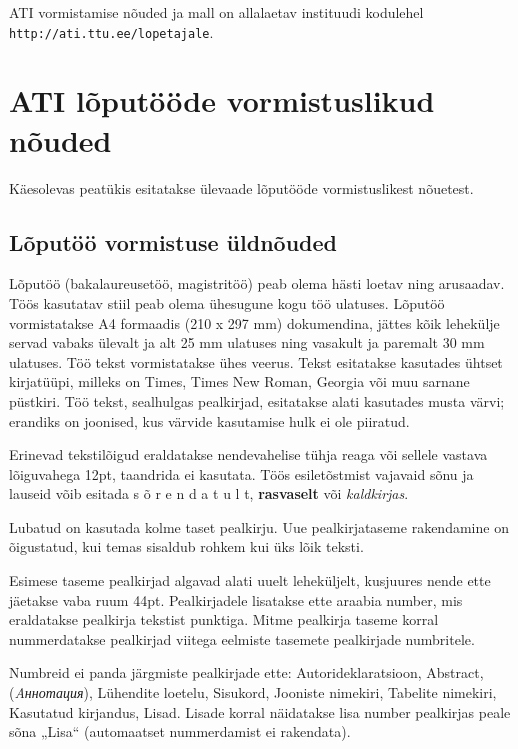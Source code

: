 \documentclass[12pt]{article} %
\begin{document}
ATI vormistamise nõuded ja mall on allalaetav instituudi kodulehel\\ \texttt{http://ati.ttu.ee/lopetajale}.

\pagebreak
\section{ATI lõputööde vormistuslikud nõuded}
\label{ATI lõputööde vormistuslikud nõuded} %
Käesolevas peatükis esitatakse ülevaade lõputööde vormistuslikest nõuetest.
\subsection{Lõputöö vormistuse üldnõuded}
Lõputöö (bakalaureusetöö, magistritöö) peab olema hästi loetav ning arusaadav. Töös kasutatav stiil peab olema ühesugune kogu töö ulatuses. Lõputöö vormistatakse A4 formaadis (210 x 297 mm) dokumendina, jättes kõik lehekülje servad vabaks ülevalt ja alt 25 mm  ulatuses ning vasakult ja paremalt 30 mm ulatuses.  Töö tekst vormistatakse ühes veerus. Tekst esitatakse kasutades ühtset kirjatüüpi, milleks on Times, Times New Roman, Georgia või muu sarnane püstkiri. Töö tekst, sealhulgas pealkirjad, esitatakse alati kasutades musta värvi; erandiks on joonised, kus värvide kasutamise hulk ei ole piiratud.

Erinevad tekstilõigud eraldatakse nendevahelise tühja reaga  või sellele vastava lõiguvahega 12pt, taandrida ei kasutata. Töös esiletõstmist vajavaid sõnu ja lauseid võib esitada s õ r e n d a t u l t, \textbf{rasvaselt} või \textsl{kaldkirjas}. 

Lubatud on kasutada kolme taset pealkirju. Uue pealkirjataseme rakendamine on õigustatud, kui temas sisaldub rohkem kui üks lõik teksti. 

Esimese taseme pealkirjad algavad alati uuelt leheküljelt, kusjuures nende ette jäetakse vaba ruum 44pt. Pealkirjadele lisatakse ette araabia number, mis eraldatakse pealkirja tekstist punktiga. Mitme pealkirja taseme korral nummerdatakse pealkirjad viitega eelmiste tasemete pealkirjade numbritele. 

Numbreid ei panda järgmiste pealkirjade ette: Autorideklaratsioon, Abstract, \foreignlanguage{russian}{(\textit{Aннотация})}, Lühendite loetelu, Sisukord, Jooniste nimekiri, Tabelite nimekiri, Kasutatud kirjandus, Lisad. Lisade korral näidatakse lisa number pealkirjas peale sõna „Lisa“ (automaatset nummerdamist ei rakendata).
\end{document}
